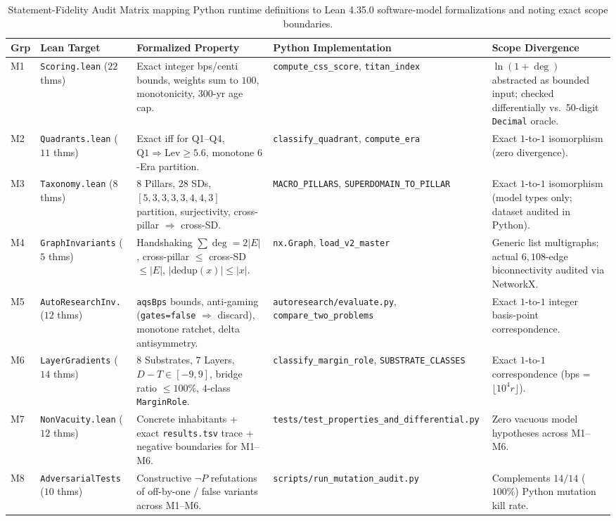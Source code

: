 \documentclass[11pt,reqno]{amsart}
\theoremstyle{plain}
\theoremstyle{definition}
\newcommand{\tcode}[1]{{\scriptsize\nolinkurl{#1}}}
\begin{document}
\begin{table}[t]
\centering
\caption{Statement-Fidelity Audit Matrix mapping Python runtime definitions to Lean 4.35.0 software-model formalizations and noting exact scope boundaries.}
\label{tab:fidelity}
\scriptsize
\renewcommand{\arraystretch}{1.15}
\begin{tabularx}{\textwidth}{@{}P{0.62cm}P{2.55cm}YP{3.05cm}P{2.55cm}@{}}
\toprule
\textbf{Grp} & \textbf{Lean Target} & \textbf{Formalized Property} & \textbf{Python Implementation} & \textbf{Scope Divergence} \\
\midrule
M1 & \tcode{Scoring.lean} ($22$ thms) & Exact integer bps/centi bounds, weights sum to $100$, monotonicity, $300$-yr age cap. & \tcode{compute_css_score}, \tcode{titan_index} & $\ln(1+\deg)$ abstracted as bounded input; checked differentially vs.\ 50-digit \tcode{Decimal} oracle. \\
M2 & \tcode{Quadrants.lean} ($11$ thms) & Exact iff for Q1--Q4, $\mathrm{Q1} \Rightarrow \mathrm{Lev} \ge 5.6$, monotone $6$-Era partition. & \tcode{classify_quadrant}, \tcode{compute_era} & Exact $1$-to-$1$ isomorphism (zero divergence). \\
M3 & \tcode{Taxonomy.lean} ($8$ thms) & $8$ Pillars, $28$ SDs, $[5,3,3,3,3,4,4,3]$ partition, surjectivity, cross-pillar $\Rightarrow$ cross-SD. & \tcode{MACRO_PILLARS}, \tcode{SUPERDOMAIN_TO_PILLAR} & Exact $1$-to-$1$ isomorphism (model types only; dataset audited in Python). \\
M4 & \tcode{GraphInvariants} ($5$ thms) & Handshaking $\sum \deg = 2|E|$, cross-pillar $\le$ cross-SD $\le |E|$, $|\mathrm{dedup}(x)| \le |x|$. & \tcode{nx.Graph}, \tcode{load_v2_master} & Generic list multigraphs; actual $6{,}108$-edge biconnectivity audited via NetworkX. \\
M5 & \tcode{AutoResearchInv.} ($12$ thms) & \tcode{aqsBps} bounds, anti-gaming (\tcode{gates=false} $\Rightarrow$ discard), monotone ratchet, delta antisymmetry. & \tcode{autoresearch/evaluate.py}, \tcode{compare_two_problems} & Exact $1$-to-$1$ integer basis-point correspondence. \\
M6 & \tcode{LayerGradients} ($14$ thms) & $8$ Substrates, $7$ Layers, $D-T \in [-9,9]$, bridge ratio $\le 100\%$, $4$-class \tcode{MarginRole}. & \tcode{classify_margin_role}, \tcode{SUBSTRATE_CLASSES} & Exact $1$-to-$1$ correspondence (bps = $\lfloor 10^4 r \rfloor$). \\
M7 & \tcode{NonVacuity.lean} ($12$ thms) & Concrete inhabitants + exact \tcode{results.tsv} trace + negative boundaries for M1--M6. & \tcode{tests/test_properties_and_differential.py} & Zero vacuous model hypotheses across M1--M6. \\
M8 & \tcode{AdversarialTests} ($10$ thms) & Constructive $\neg P$ refutations of off-by-one / false variants across M1--M6. & \tcode{scripts/run_mutation_audit.py} & Complements $14/14$ ($100\%$) Python mutation kill rate. \\
\bottomrule
\end{tabularx}
\end{table}
\end{document}
